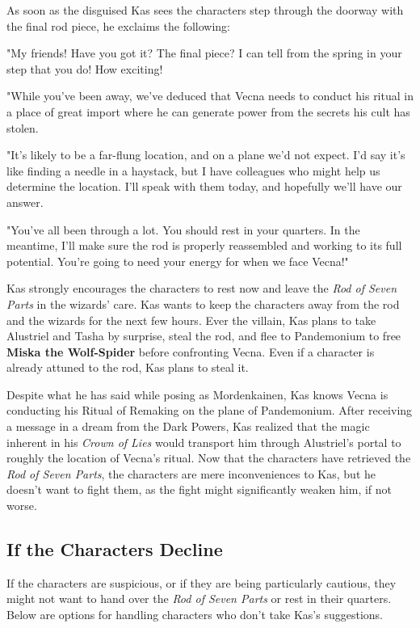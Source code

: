 \documentclass[10pt,a4paper,twoside,bg=print,twocolumn,openany,nodeprecatedcode]{dndbook}
\begin{document}
As soon as the disguised Kas sees the characters step through the doorway with the final rod piece, he exclaims the following:

\begin{DndReadAloud}{}
"My friends! Have you got it? The final piece? I can tell from the spring in your step that you do! How exciting!

"While you've been away, we've deduced that Vecna needs to conduct his ritual in a place of great import where he can generate power from the secrets his cult has stolen.

"It's likely to be a far-flung location, and on a plane we'd not expect. I'd say it's like finding a needle in a haystack, but I have colleagues who might help us determine the location. I'll speak with them today, and hopefully we'll have our answer.

"You've all been through a lot. You should rest in your quarters. In the meantime, I'll make sure the rod is properly reassembled and working to its full potential. You're going to need your energy for when we face Vecna!"

\end{DndReadAloud}

Kas strongly encourages the characters to rest now and leave the \textit{Rod of Seven Parts} in the wizards' care. Kas wants to keep the characters away from the rod and the wizards for the next few hours. Ever the villain, Kas plans to take Alustriel and Tasha by surprise, steal the rod, and flee to Pandemonium to free \textbf{Miska the Wolf-Spider} before confronting Vecna. Even if a character is already attuned to the rod, Kas plans to steal it.

Despite what he has said while posing as Mordenkainen, Kas knows Vecna is conducting his Ritual of Remaking on the plane of Pandemonium. After receiving a message in a dream from the Dark Powers, Kas realized that the magic inherent in his \textit{Crown of Lies} would transport him through Alustriel's portal to roughly the location of Vecna's ritual. Now that the characters have retrieved the \textit{Rod of Seven Parts}, the characters are mere inconveniences to Kas, but he doesn't want to fight them, as the fight might significantly weaken him, if not worse.

\subsection{If the Characters Decline}
If the characters are suspicious, or if they are being particularly cautious, they might not want to hand over the \textit{Rod of Seven Parts} or rest in their quarters. Below are options for handling characters who don't take Kas's suggestions.
\end{document}
